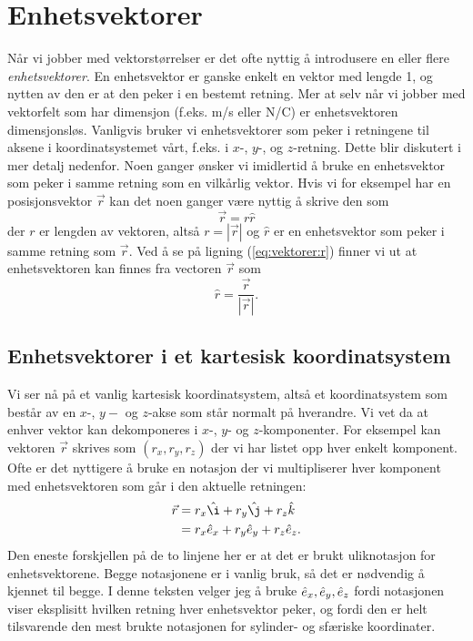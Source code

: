 \section{Enhetsvektorer}
Når vi jobber med vektorstørrelser er det ofte nyttig å introdusere en eller flere \emph{enhetsvektorer}. En enhetsvektor er ganske enkelt en vektor med lengde 1, og nytten av den er at den peker i en bestemt retning. Mer at selv når vi jobber med vektorfelt som har dimensjon (f.eks. m/s eller N/C) er enhetsvektoren dimensjonsløs. Vanligvis bruker vi enhetsvektorer som peker i retningene til aksene i koordinatsystemet vårt, f.eks. i $x$-, $y$-, og $z$-retning. Dette blir diskutert i mer detalj nedenfor. Noen ganger ønsker vi imidlertid å bruke en enhetsvektor som peker i samme retning som en vilkårlig vektor. Hvis vi for eksempel har en posisjonsvektor $\vec{r}$ kan det noen ganger være nyttig å skrive den som 
\begin{equation}
	\vec{r} = r \hat{r}
	\label{eq:vektorer:r}
\end{equation}
der $r$ er lengden av vektoren, altså $r = |\vec{r}|$ og $\hat{r}$ er en enhetsvektor som peker i samme retning som $\vec{r}$. Ved å se på ligning (\ref{eq:vektorer:r}) finner vi ut at enhetsvektoren kan finnes fra vectoren $\vec{r}$ som
\begin{displaymath}
	\hat{r} = \frac{\vec{r}}{|\vec{r}|}.
\end{displaymath}

\subsection{Enhetsvektorer i et kartesisk koordinatsystem}
Vi ser nå på et vanlig kartesisk koordinatsystem, altså et koordinatsystem som består av en $x$-, $y-$ og $z$-akse som står normalt på hverandre. Vi vet da at enhver vektor kan dekomponeres i $x$-, $y$- og $z$-komponenter. For eksempel kan vektoren $\vec{r}$ skrives som $(r_x, r_y, r_z)$ der vi har listet opp hver enkelt komponent. Ofte er det nyttigere å bruke en notasjon der vi multipliserer hver komponent med enhetsvektoren som går i den aktuelle retningen:
\begin{displaymath}
\begin{aligned}
	\vec{r} &= r_x\hat{\i} + r_y\hat{\j} + r_z\hat{k} \\
	&= r_x\ex + r_y\ey + r_z\ez.
\end{aligned}
\end{displaymath}
Den eneste forskjellen på de to linjene her er at det er brukt uliknotasjon for enhetsvektorene. Begge notasjonene er i vanlig bruk, så det er nødvendig å kjennet til begge. I denne teksten velger jeg å bruke $\hat{e}_x, \hat{e}_y, \hat{e}_z$ fordi notasjonen viser eksplisitt hvilken retning hver enhetsvektor peker, og fordi den er helt tilsvarende den mest brukte notasjonen for sylinder- og sfæriske koordinater.

